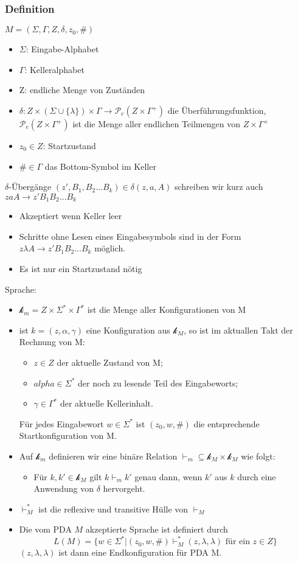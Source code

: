 \documentclass[9pt]{article}
\begin{document}
 \subsubsection{Definition}
 $M = (\Sigma, \Gamma, Z, \delta, z_0, \#)$
 \begin{itemize}
 	\item $\Sigma$: Eingabe-Alphabet
 	\item $\Gamma$: Kelleralphabet
 	\item Z: endliche Menge von Zuständen
 	\item $\delta: Z \times (\Sigma \cup \{\lambda\}) \times \Gamma \to \mathcal{P}_e(Z \times \Gamma^+)$ die Überführungsfunktion, $\mathcal{P}_e(Z \times \Gamma^+)$ ist die Menge aller endlichen Teilmengen von $Z \times \Gamma^+$
 	\item $z_0 \in Z$: Startzustand
 	\item $\# \in \Gamma$ das Bottom-Symbol im Keller
 \end{itemize}
 $\delta$-Übergänge $(z', B_1,B_2 \dots B_k)\in \delta(z, a, A)$ schreiben wir kurz auch $zaA \to z'B_1B_2\dots B_k$
 \begin{itemize}
 	\item Akzeptiert wenn Keller leer
 	\item Schritte ohne Lesen eines Eingabesymbols  sind in der Form $z\lambda A \to z'B_1B_2 \dots B_k$ möglich.
 	\item Es ist nur ein Startzustand nötig
 \end{itemize}
 Sprache:
 \begin{itemize}
 	\item  $\mathcal{k}_m = Z \times \Sigma^* \times \Gamma^*$ ist die Menge aller Konfigurationen von M
 	\item ist $k = (z, \alpha, \gamma)$ eine Konfiguration aus $\mathcal{k}_M$, so ist im aktuallen Takt der Rechnung von M:
 	\begin{itemize}
 		\item $z \in Z$ der aktuelle Zustand von M;
 		\item $alpha \in \Sigma^*$ der noch zu lesende Teil des Eingabeworts;
 		\item $\gamma \in \Gamma^*$ der aktuelle Kellerinhalt.
 	\end{itemize}
 	Für jedes Eingabewort $w \in \Sigma^*$ ist $(z_0, w, \#)$ die entsprechende Startkonfiguration von M.
 	\item Auf $\mathcal{k}_m$ definieren wir eine binäre Relation $\vdash_m \subseteq \mathcal{k}_M \times \mathcal{k}_M$ wie folgt:
 	\begin{itemize}
 		\item Für $k, k' \in \mathcal{k}_M$ gilt $k \vdash_m k'$ genau dann, wenn $k'$ aus $k$ durch eine Anwendung von $\delta$ hervorgeht.
 	\end{itemize}
 	\item $\vdash^*_M$ ist die reflexive und transitive Hülle von $\vdash_M$
 	\item Die vom PDA $M$ akzeptierte Sprache ist definiert durch
 	$$L(M) = \{w \in \Sigma^*|(z_0, w, \#)\vdash^*_M (z, \lambda, \lambda) \text{ für ein } z \in Z\}$$
 	$(z, \lambda, \lambda)$ ist dann eine Endkonfiguration für PDA M.
 \end{itemize}
\end{document}
